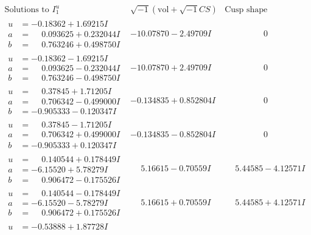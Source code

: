 \documentclass[1p]{elsarticle_modified}
\theoremstyle{definition}
\newcommand{\I}{\sqrt{-1}}
\begin{document}
$$\begin{array}{c|c|c}
\text{Solutions to }I^u_{1}& \I (\text{vol} + \sqrt{-1}CS) & \text{Cusp shape}\\
 \hline 
\begin{aligned}
u &= -0.18362 + 1.69215 I \\
a &= \phantom{-}0.093625 + 0.232044 I \\
b &= \phantom{-}0.763246 + 0.498750 I\end{aligned}
 & -10.07870 - 2.49709 I & \phantom{-0.000000 } 0 \\ \hline\begin{aligned}
u &= -0.18362 - 1.69215 I \\
a &= \phantom{-}0.093625 - 0.232044 I \\
b &= \phantom{-}0.763246 - 0.498750 I\end{aligned}
 & -10.07870 + 2.49709 I & \phantom{-0.000000 } 0 \\ \hline\begin{aligned}
u &= \phantom{-}0.37845 + 1.71205 I \\
a &= \phantom{-}0.706342 - 0.499000 I \\
b &= -0.905333 - 0.120347 I\end{aligned}
 & -0.134835 + 0.852804 I & \phantom{-0.000000 } 0 \\ \hline\begin{aligned}
u &= \phantom{-}0.37845 - 1.71205 I \\
a &= \phantom{-}0.706342 + 0.499000 I \\
b &= -0.905333 + 0.120347 I\end{aligned}
 & -0.134835 - 0.852804 I & \phantom{-0.000000 } 0 \\ \hline\begin{aligned}
u &= \phantom{-}0.140544 + 0.178449 I \\
a &= -6.15520 + 5.78279 I \\
b &= \phantom{-}0.906472 - 0.175526 I\end{aligned}
 & \phantom{-}5.16615 - 0.70559 I & \phantom{-}5.44585 - 4.12571 I \\ \hline\begin{aligned}
u &= \phantom{-}0.140544 - 0.178449 I \\
a &= -6.15520 - 5.78279 I \\
b &= \phantom{-}0.906472 + 0.175526 I\end{aligned}
 & \phantom{-}5.16615 + 0.70559 I & \phantom{-}5.44585 + 4.12571 I \\ \hline\begin{aligned}
u &= -0.53888 + 1.87728 I \\

\end{aligned}
\end{array}$$
\end{document}
